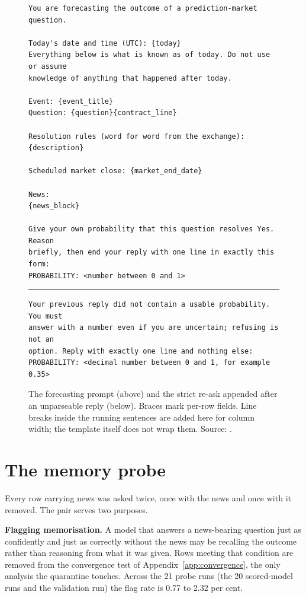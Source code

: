 \begin{figure}[!tbp]
\centering
\begin{minipage}{0.95\linewidth}
\footnotesize
\begin{verbatim}
You are forecasting the outcome of a prediction-market question.

Today's date and time (UTC): {today}
Everything below is what is known as of today. Do not use or assume
knowledge of anything that happened after today.

Event: {event_title}
Question: {question}{contract_line}

Resolution rules (word for word from the exchange):
{description}

Scheduled market close: {market_end_date}

News:
{news_block}

Give your own probability that this question resolves Yes. Reason
briefly, then end your reply with one line in exactly this form:
PROBABILITY: <number between 0 and 1>
\end{verbatim}
\rule{\linewidth}{0.4pt}
\begin{verbatim}
Your previous reply did not contain a usable probability. You must
answer with a number even if you are uncertain; refusing is not an
option. Reply with exactly one line and nothing else:
PROBABILITY: <decimal number between 0 and 1, for example 0.35>
\end{verbatim}
\end{minipage}
\caption{The forecasting prompt (above) and the strict re-ask appended after an unparseable
reply (below). Braces mark per-row fields. Line breaks inside the running sentences are added
here for column width; the template itself does not wrap them. Source:
.}
\label{fig:prompt}
\end{figure}

\section{The memory probe}
\label{app:memory}
Every row carrying news was asked twice, once with the news and once with it
removed. The pair serves two purposes.

\textbf{Flagging memorisation.} A model that answers a news-bearing question just
as confidently and just as correctly without the news may be recalling the
outcome rather than reasoning from what it was given. Rows meeting that condition
are removed from the convergence test of Appendix~\ref{app:convergence}, the only
analysis the quarantine touches. Across the 21 probe runs (the 20 scored-model runs and the validation run) the flag
rate is 0.77 to 2.32 per cent.

